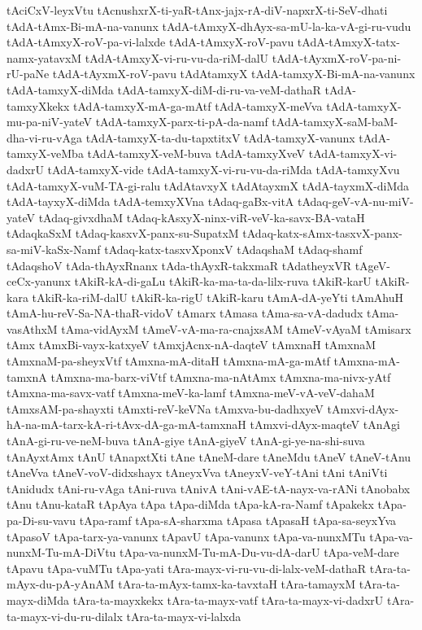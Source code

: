 {tAciCxV-leyxVtu
tAcnushxrX-ti-yaR-tAnx-jajx-rA-diV-napxrX-ti-SeV-dhati
tAdA-tAmx-Bi-mA-na-vanunx
tAdA-tAmxyX-dhAyx-sa-mU-la-ka-vA-gi-ru-vudu
tAdA-tAmxyX-roV-pa-vi-lalxde
tAdA-tAmxyX-roV-pavu
tAdA-tAmxyX-tatx-namx-yatavxM
tAdA-tAmxyX-vi-ru-vu-da-riM-dalU
tAdA-tAyxmX-roV-pa-ni-rU-paNe
tAdA-tAyxmX-roV-pavu
tAdAtamxyX
tAdA-tamxyX-Bi-mA-na-vanunx
tAdA-tamxyX-diMda
tAdA-tamxyX-diM-di-ru-va-veM-dathaR
tAdA-tamxyXkekx
tAdA-tamxyX-mA-ga-mAtf
tAdA-tamxyX-meVva
tAdA-tamxyX-mu-pa-niV-yateV
tAdA-tamxyX-parx-ti-pA-da-namf
tAdA-tamxyX-saM-baM-dha-vi-ru-vAga
tAdA-tamxyX-ta-du-tapxtitxV
tAdA-tamxyX-vanunx
tAdA-tamxyX-veMba
tAdA-tamxyX-veM-buva
tAdA-tamxyXveV
tAdA-tamxyX-vi-dadxrU
tAdA-tamxyX-vide
tAdA-tamxyX-vi-ru-vu-da-riMda
tAdA-tamxyXvu
tAdA-tamxyX-vuM-TA-gi-ralu
tAdAtavxyX
tAdAtayxmX
tAdA-tayxmX-diMda
tAdA-tayxyX-diMda
tAdA-temxyXVna
tAdaq-gaBx-vitA
tAdaq-geV-vA-nu-miV-yateV
tAdaq-givxdhaM
tAdaq-kAsxyX-ninx-viR-veV-ka-savx-BA-vataH
tAdaqkaSxM
tAdaq-kasxvX-panx-su-SupatxM
tAdaq-katx-sAmx-tasxvX-panx-sa-miV-kaSx-Namf
tAdaq-katx-tasxvXponxV
tAdaqshaM
tAdaq-shamf
tAdaqshoV
tAda-thAyxRnanx
tAda-thAyxR-takxmaR
tAdatheyxVR
tAgeV-ceCx-yanunx
tAkiR-kA-di-gaLu
tAkiR-ka-ma-ta-da-lilx-ruva
tAkiR-karU
tAkiR-kara
tAkiR-ka-riM-dalU
tAkiR-ka-rigU
tAkiR-karu
tAmA-dA-yeYti
tAmAhuH
tAmA-hu-reV-Sa-NA-thaR-vidoV
tAmarx
tAmasa
tAma-sa-vA-dadudx
tAma-vasAthxM
tAma-vidAyxM
tAmeV-vA-ma-ra-cnajxsAM
tAmeV-vAyaM
tAmisarx
tAmx
tAmxBi-vayx-katxyeV
tAmxjAcnx-nA-daqteV
tAmxnaH
tAmxnaM
tAmxnaM-pa-sheyxVtf
tAmxna-mA-ditaH
tAmxna-mA-ga-mAtf
tAmxna-mA-tamxnA
tAmxna-ma-barx-viVtf
tAmxna-ma-nAtAmx
tAmxna-ma-nivx-yAtf
tAmxna-ma-savx-vatf
tAmxna-meV-ka-lamf
tAmxna-meV-vA-veV-dahaM
tAmxsAM-pa-shayxti
tAmxti-reV-keVNa
tAmxva-bu-dadhxyeV
tAmxvi-dAyx-hA-na-mA-tarx-kA-ri-tAvx-dA-ga-mA-tamxnaH
tAmxvi-dAyx-maqteV
tAnAgi
tAnA-gi-ru-ve-neM-buva
tAnA-giye
tAnA-giyeV
tAnA-gi-ye-na-shi-suva
tAnAyxtAmx
tAnU
tAnapxtXti
tAne
tAneM-dare
tAneMdu
tAneV
tAneV-tAnu
tAneVva
tAneV-voV-didxshayx
tAneyxVva
tAneyxV-veY-tAni
tAni
tAniVti
tAnidudx
tAni-ru-vAga
tAni-ruva
tAnivA
tAni-vAE-tA-nayx-va-rANi
tAnobabx
tAnu
tAnu-kataR
tApAya
tApa
tApa-diMda
tApa-kA-ra-Namf
tApakekx
tApa-pa-Di-su-vavu
tApa-ramf
tApa-sA-sharxma
tApasa
tApasaH
tApa-sa-seyxYva
tApasoV
tApa-tarx-ya-vanunx
tApavU
tApa-vanunx
tApa-va-nunxMTu
tApa-va-nunxM-Tu-mA-DiVtu
tApa-va-nunxM-Tu-mA-Du-vu-dA-darU
tApa-veM-dare
tApavu
tApa-vuMTu
tApa-yati
tAra-mayx-vi-ru-vu-di-lalx-veM-dathaR
tAra-ta-mAyx-du-pA-yAnAM
tAra-ta-mAyx-tamx-ka-tavxtaH
tAra-tamayxM
tAra-ta-mayx-diMda
tAra-ta-mayxkekx
tAra-ta-mayx-vatf
tAra-ta-mayx-vi-dadxrU
tAra-ta-mayx-vi-du-ru-dilalx
tAra-ta-mayx-vi-lalxda
}
